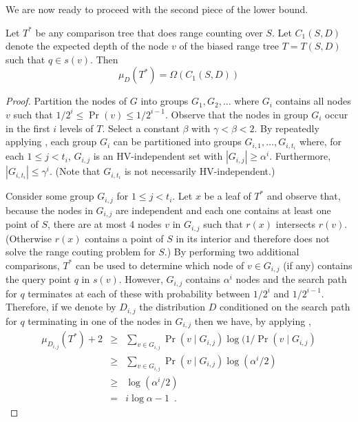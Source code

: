 \documentclass[lotsofwhite,charterfonts]{patmorin}
\begin{document}
We are now ready to proceed with the second piece of the lower bound.

\begin{lem}
Let $T^*$ be any comparison tree that does range counting over $S$. Let
$C_1(S,D)$ denote the expected depth of the node $v$ of the biased
range tree $T=T(S,D)$ such that $q\in s(v)$.  Then
\[
    \mu_D(T^*) = \Omega(C_1(S,D))
\]
\end{lem}


\begin{proof}

Partition the nodes of $G$ into groups $G_1,G_2,\ldots$ where $G_i$
contains all nodes $v$ such that $1/2^{i} \le \Pr(v) \le 1/2^{i-1}$.
Observe that the nodes in group $G_i$ occur in the first $i$ levels of
$T$.  Select a constant $\beta$ with $\gamma < \beta < 2$.  By
repeatedly applying , each group $G_i$ can be
partitioned into groups $G_{i,1},\ldots,G_{i,t_i}$ where, for each $1
\le j < t_i$, $G_{i,j}$ is an HV-independent set with $|G_{i,j}|
\ge \alpha^i$.  Furthermore, $|G_{i,t_i}| \le \gamma^i$. (Note that
$G_{i,t_i}$ is not necessarily HV-independent.)

Consider some group $G_{i,j}$ for $1\le j < t_i$.  Let $x$ be a leaf
of $T^*$ and observe that, because the nodes in $G_{i,j}$ are
independent and each one contains at least one point of $S$, there are
at most 4 nodes $v$ in $G_{i,j}$ such that $r(x)$ intersects $r(v)$.
(Otherwise $r(x)$ contains a point of $S$ in its interior and
therefore does not solve the range couting problem for $S$.)
By performing two additional comparisons, $T^*$ can be used to
determine which node of $v\in G_{i,j}$ (if any) contains the query point
$q$ in $s(v)$.  
However, $G_{i,j}$ contains $\alpha^i$ nodes and the search path
for $q$ terminates at each of these with probability between $1/2^i$
and $1/2^{i-1}$.
Therefore, if we denote by $D_{i,j}$ the distribution $D$ conditioned
on the search path for $q$ terminating in one of the nodes in
$G_{i,j}$ then we have, by applying ,
\begin{eqnarray*}
   \mu_{D_{i,j}}(T^*) + 2 
    & \ge & \sum_{v\in G_{i,j}}\Pr(v\mid G_{i,j})\log(1/\Pr(v\mid G_{i,j}) \\
    & \ge & \sum_{v\in G_{i,j}}\Pr(v\mid G_{i,j})\log(\alpha^i/2) \\
    & \ge & \log(\alpha^i/2) \\
    & = & i\log\alpha - 1 \enspace .
\end{eqnarray*}


\end{proof}
\end{document}
